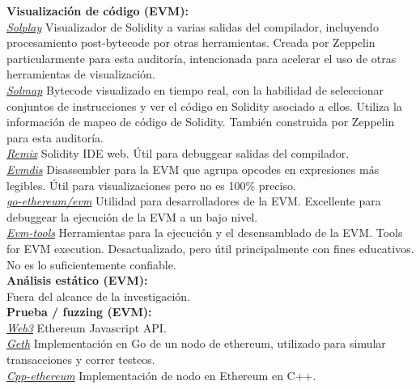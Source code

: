 \textbf{Visualización de código (EVM):}\\

\underline{\textit{Solplay}}\cite{SolplayLink}
Visualizador de Solidity a varias salidas del compilador, incluyendo procesamiento post-bytecode por otras herramientas. Creada por Zeppelin particularmente para esta auditoría, intencionada para acelerar el uso de otras herramientas de visualización.\\

\underline{\textit{Solmap}}\cite{SolmapLink}
Bytecode visualizado en tiempo real, con la habilidad de seleccionar conjuntos de instrucciones y ver el código en Solidity asociado a ellos. Utiliza la información de mapeo de código de Solidity. También construida por Zeppelin para esta auditoría.\\

\underline{\textit{Remix}}\cite{RemixLink}
Solidity IDE web. Útil para debuggear salidas del compilador. \\

\underline{\textit{Evmdis}}\cite{EvmdisLink}
Disassembler para la EVM que agrupa opcodes en expresiones más legibles. Útil para visualizaciones pero no es 100\% preciso.\\

\underline{\textit{go-ethereum/evm}}\cite{goEthereumLink}
Utilidad para desarrolladores de la EVM. Excellente para debuggear la ejecución de la EVM a un bajo nivel.\\

\underline{\textit{Evm-tools}}\cite{evmToolsLink}
Herramientas para la ejecución y el desensamblado de la EVM. Tools for EVM execution. Desactualizado, pero útil principalmente con fines educativos. No es lo suficientemente confiable.\\

\textbf{Análisis estático (EVM):}\\
Fuera del alcance de la investigación.\\

\textbf{Prueba / fuzzing (EVM):}\\

\underline{\textit{Web3}}\cite{Web3Link}
Ethereum Javascript API.\\

\underline{\textit{Geth}}\cite{GethLink}
Implementación en Go de un nodo de ethereum, utilizado para simular transacciones y correr testeos.\\

\underline{\textit{Cpp-ethereum}}\cite{cppEthereumLink}
Implementación de nodo en Ethereum en C++.\\

